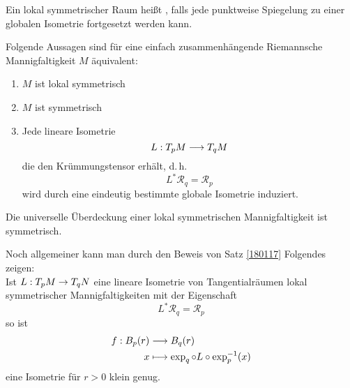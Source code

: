 \documentclass{book}
\renewcommand{\i}{^{-1}}
\newcommand{\Rc}{\mathcal{R}}
\begin{document}
\Def{}
Ein lokal symmetrischer Raum heißt , falls jede punktweise Spiegelung zu einer globalen Isometrie fortgesetzt werden kann.

\Satz{}
Folgende Aussagen sind für eine einfach zusammenhängende Riemannsche Mannigfaltigkeit $M$ äquivalent:
\begin{enumerate}[1.)]
\item $M$ ist lokal symmetrisch
\item $M$ ist symmetrisch
\item Jede lineare Isometrie
\[L : T_pM \overset{}{\longrightarrow} T_qM \]
die den Krümmungstensor erhält, d.\,h.
\[ L^*\Rc_q = \Rc_p \]
wird durch eine eindeutig bestimmte globale Isometrie induziert.
\end{enumerate}

\Kor{}
Die universelle Überdeckung einer lokal symmetrischen Mannigfaltigkeit ist symmetrisch.

\Bem{}
Noch allgemeiner kann man durch den Beweis von Satz \ref{180117} Folgendes zeigen:\\
Ist $L : T_pM \overset{}{\rightarrow} T_q N$ eine lineare Isometrie von Tangentialräumen lokal symmetrischer Mannigfaltigkeiten mit der Eigenschaft
\[ L^*\Rc_q =\Rc_p \]
so ist
\begin{align*}
f : B_p(r) & \Pfeil{} B_q(r)\\
x & \longmapsto \exp_q \circ L \circ \exp_p\i(x)
\end{align*}
eine Isometrie für $r > 0$ klein genug.
\end{document}

